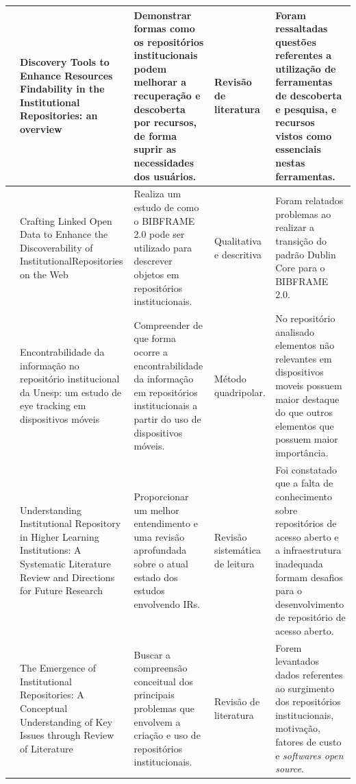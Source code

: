 \begin{landscape}
\begin{table}[H]
{\begin{tabular}{|p{5cm}|p{12cm}|p{12cm}|p{4cm}|p{13cm}|}
                \cite{2019:Mettai}           & Discovery Tools to Enhance Resources Findability in the Institutional Repositories: an overview                                           & Demonstrar formas como os repositórios institucionais podem melhorar a recuperação e descoberta por recursos, de forma suprir as necessidades dos usuários. & Revisão de literatura               & Foram ressaltadas questões referentes a utilização de ferramentas de descoberta e pesquisa, e recursos vistos como essenciais nestas ferramentas.                                            \\ \hline
                \cite{2019:Jin}              & Crafting Linked Open Data to Enhance the Discoverability of InstitutionalRepositories on the Web                                          & Realiza um estudo de como o BIBFRAME 2.0 pode ser utilizado para descrever objetos em repositórios institucionais.                                          & Qualitativa e descritiva            & Foram relatados problemas ao realizar a transição do padrão Dublin Core para o BIBFRAME 2.0.                                                                                                 \\ \hline
                \cite{2019:FernandesMacedes} & Encontrabilidade da informação no repositório institucional da Unesp: um estudo de eye tracking em dispositivos móveis                    & Compreender de que forma ocorre a encontrabilidade da informação em repositórios institucionais a partir do uso de dispositivos móveis.                     & Método quadripolar.                 & No repositório analisado elementos não relevantes em dispositivos moveis possuem maior destaque do que outros elementos que possuem maior importância.                                       \\ \hline
                \cite{2019:Asadi}            & Understanding Institutional Repository in Higher Learning Institutions: A Systematic Literature Review and Directions for Future Research & Proporcionar um melhor entendimento e uma revisão aprofundada sobre o atual estado dos estudos envolvendo IRs.                                              & Revisão sistemática de leitura      & Foi constatado que a falta de conhecimento sobre repositórios de acesso aberto e a infraestrutura inadequada formam desafios para o desenvolvimento de repositório de acesso aberto.         \\ \hline
                \cite{2018:Saini}            & The Emergence of Institutional Repositories: A Conceptual Understanding of Key Issues through Review of Literature                        & Buscar a compreensão conceitual dos principais problemas que envolvem a criação e uso de repositórios institucionais.                                       & Revisão de literatura               & Forem levantados dados referentes ao surgimento dos repositórios institucionais, motivação, fatores de custo e \emph{softwares open source}.                                                 \\ \hline

\end{tabular}}
\end{table}
\end{landscape}
